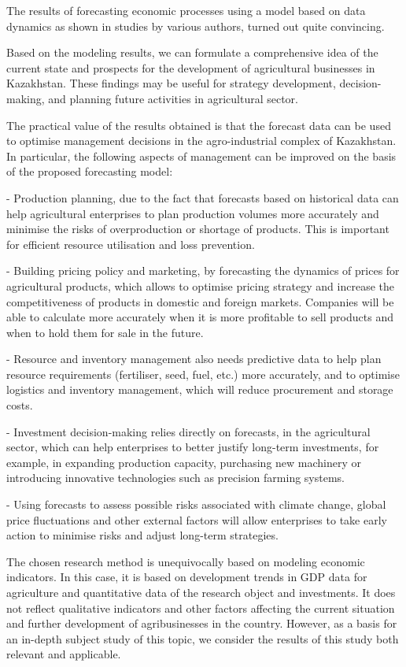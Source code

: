 The results of forecasting economic processes using a model based on
data dynamics as shown in studies by various authors, turned out quite
convincing.

Based on the modeling results, we can formulate a comprehensive idea of
the current state and prospects for the development of agricultural
businesses in Kazakhstan. These findings may be useful for strategy
development, decision-making, and planning future activities in
agricultural sector.

The practical value of the results obtained is that the forecast data
can be used to optimise management decisions in the agro-industrial
complex of Kazakhstan. In particular, the following aspects of
management can be improved on the basis of the proposed forecasting
model:

- Production planning, due to the fact that forecasts based on
historical data can help agricultural enterprises to plan production
volumes more accurately and minimise the risks of overproduction or
shortage of products. This is important for efficient resource
utilisation and loss prevention.

- Building pricing policy and marketing, by forecasting the dynamics of
prices for agricultural products, which allows to optimise pricing
strategy and increase the competitiveness of products in domestic and
foreign markets. Companies will be able to calculate more accurately
when it is more profitable to sell products and when to hold them for
sale in the future.

- Resource and inventory management also needs predictive data to help
plan resource requirements (fertiliser, seed, fuel, etc.) more
accurately, and to optimise logistics and inventory management, which
will reduce procurement and storage costs.

- Investment decision-making relies directly on forecasts, in the
agricultural sector, which can help enterprises to better justify
long-term investments, for example, in expanding production capacity,
purchasing new machinery or introducing innovative technologies such as
precision farming systems.

- Using forecasts to assess possible risks associated with climate
change, global price fluctuations and other external factors will allow
enterprises to take early action to minimise risks and adjust long-term
strategies.

The chosen research method is unequivocally based on modeling economic
indicators. In this case, it is based on development trends in GDP data
for agriculture and quantitative data of the research object and
investments. It does not reflect qualitative indicators and other
factors affecting the current situation and further development of
agribusinesses in the country. However, as a basis for an in-depth
subject study of this topic, we consider the results of this study both
relevant and applicable.

